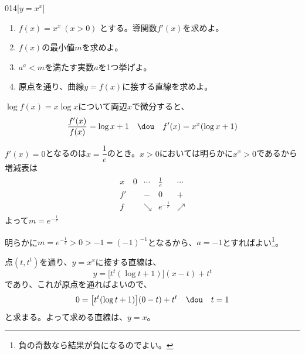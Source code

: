 \begin{prob}{014}{}{[$y=x^x$]}
 \begin{enumerate}
  \item $f(x)=x^x~(x>0)$ とする。導関数$f'(x)$を求めよ。
  \item $f(x)$の最小値$m$を求めよ。
  \item $a^a < m$を満たす実数$a$を1つ挙げよ。
  \item 原点を通り、曲線$y=f(x)$に接する直線を求めよ。
 \end{enumerate}
\end{prob}
$\log f(x)=x\log x$について両辺$x$で微分すると、
\[ \frac{f'(x)}{f(x)}=\log x+1 \quad\dou\quad f'(x)=x^x(\log x+1) \]

$f'(x)=0$となるのは$x=\dfrac{1}{e}$のとき。$x>0$においては明らかに$x^x>0$であるから増減表は
\begin{align*}
\begin{array}{c|c|c|c|c}
 x & 0 & \cdots & \frac{1}{e} & \cdots \\ \hline\hline
 f' & & - & 0 & + \\ \hline
 f & & \searrow & e^{-\frac{1}{e}} & \nearrow
\end{array}
\end{align*}
よって$m=e^{-\frac{1}{e}}$

明らかに$m=e^{-\frac{1}{e}}>0>-1=(-1)^{-1}$となるから、$a=-1$とすればよい\footnote{負の奇数なら結果が負になるのでよい。}。

点$(t,t^t)$を通り、$y=x^x$に接する直線は、
\[ y=\bigl[t^t(\log t+1)\bigr](x-t)+t^t \]
であり、これが原点を通ればよいので、
\[ 0=\bigl[t^t(\log t+1)\bigr](0-t)+t^t \quad\dou\quad t=1 \]
と求まる。よって求める直線は、$y=x$。